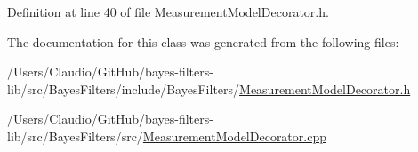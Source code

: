 Definition at line 40 of file Measurement\+Model\+Decorator.\+h.



The documentation for this class was generated from the following files\+:\begin{DoxyCompactItemize}
\item 
/\+Users/\+Claudio/\+Git\+Hub/bayes-\/filters-\/lib/src/\+Bayes\+Filters/include/\+Bayes\+Filters/\mbox{\hyperlink{MeasurementModelDecorator_8h}{Measurement\+Model\+Decorator.\+h}}\item 
/\+Users/\+Claudio/\+Git\+Hub/bayes-\/filters-\/lib/src/\+Bayes\+Filters/src/\mbox{\hyperlink{MeasurementModelDecorator_8cpp}{Measurement\+Model\+Decorator.\+cpp}}\end{DoxyCompactItemize}
